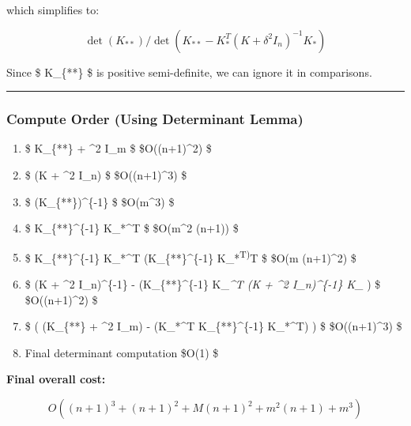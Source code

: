 \documentclass[
  letterpaper,
  DIV=11,
  numbers=noendperiod]{scrartcl}
\providecommand{\tightlist}{%
  \setlength{\itemsep}{0pt}\setlength{\parskip}{0pt}}\usepackage{longtable,booktabs,array}
\begin{document}
which simplifies to:

\[
\det(K_{**}) / \det(K_{**} - K_*^T (K + \delta^2 I_n)^{-1} K_*)
\]

Since \$ K\_\{**\} \$ is positive semi-definite, we can ignore it in
comparisons.

\begin{center}\rule{0.5\linewidth}{0.5pt}\end{center}

\hypertarget{compute-order-using-determinant-lemma}{%
\subsubsection{Compute Order (Using Determinant
Lemma)}\label{compute-order-using-determinant-lemma}}

\begin{enumerate}
\def\labelenumi{\arabic{enumi}.}
\tightlist
\item
  \$ K\_\{**\} + \delta\^{}2 I\_m \$ \$\quad O((n+1)\^{}2) \$
\item
  \$ \det(K + \delta\^{}2 I\_n) \$ \$\quad O((n+1)\^{}3) \$
\item
  \$ (K\_\{**\})\^{}\{-1\} \$ \$\quad O(m\^{}3) \$
\item
  \$ K\_\{**\}\^{}\{-1\} K\_*\^{}T \$ \$\quad O(m\^{}2 (n+1)) \$
\item
  \$ K\_\{**\}\^{}\{-1\} K\_*\^{}T (K\_\{**\}\^{}\{-1\}
  K\_*\textsuperscript{T)}T \$ \$\quad O(m (n+1)\^{}2) \$
\item
  \$ (K + \delta\^{}2 I\_n)\^{}\{-1\} - (K\_\{**\}\^{}\{-1\}
  K\_\emph{\^{}T (K + \delta\^{}2 I\_n)\^{}\{-1\} K\_} ) \$
  \$\quad O((n+1)\^{}2) \$
\item
  \$ \det \Big( (K\_\{**\} + \delta\^{}2 I\_m) - (K\_*\^{}T
  K\_\{**\}\^{}\{-1\} K\_*\^{}T) \Big) \$ \$\quad O((n+1)\^{}3) \$
\item
  Final determinant computation \$\quad O(1) \$
\end{enumerate}

\textbf{Final overall cost:}

\[
O((n+1)^3 + (n+1)^2 + M (n+1)^2 + m^2 (n+1) + m^3)
\]
\end{document}
